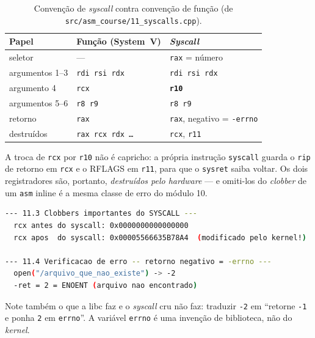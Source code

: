 \begin{table}[htbp]
\centering
\caption{Convenção de \emph{syscall} contra convenção de função
         (de \texttt{src/asm\_course/11\_syscalls.cpp}).}
\label{tab:syscall-abi}
\footnotesize
\begin{tabular}{@{}lll@{}}
\toprule
\textbf{Papel} & \textbf{Função (System~V)} & \textbf{\emph{Syscall}} \\
\midrule
seletor            & ---                  & \texttt{rax} = número \\
argumentos 1--3    & \texttt{rdi rsi rdx} & \texttt{rdi rsi rdx} \\
argumento 4        & \texttt{rcx}         & \textbf{\texttt{r10}} \\
argumentos 5--6    & \texttt{r8 r9}       & \texttt{r8 r9} \\
retorno            & \texttt{rax}         & \texttt{rax}, negativo = \texttt{-errno} \\
destruídos         & \texttt{rax rcx rdx \dots} & \texttt{rcx}, \texttt{r11} \\
\bottomrule
\end{tabular}
\end{table}

A troca de \texttt{rcx} por \texttt{r10} não é capricho: a própria instrução
\texttt{syscall} guarda o \texttt{rip} de retorno em \texttt{rcx} e o RFLAGS em
\texttt{r11}, para que o \texttt{sysret} saiba voltar. Os dois registradores
são, portanto, \emph{destruídos pelo hardware} --- e omiti-los do
\emph{clobber} de um \texttt{asm} inline é a mesma classe de erro do módulo 10.

\begin{lstlisting}[style=bt, language=bash,
    caption={Saída medida de \texttt{dist/bin/asm\_11\_syscalls}: a prova de que
             \texttt{rcx} é destruído, e o retorno negativo como \texttt{errno}.}]
--- 11.3 Clobbers importantes do SYSCALL ---
  rcx antes do syscall: 0x0000000000000000
  rcx apos  do syscall: 0x00005566635B78A4  (modificado pelo kernel!)

--- 11.4 Verificacao de erro -- retorno negativo = -errno ---
  open("/arquivo_que_nao_existe") -> -2
  -ret = 2 = ENOENT (arquivo nao encontrado)
\end{lstlisting}

Note também o que a libc faz e o \emph{syscall} cru não faz: traduzir
\texttt{-2} em ``retorne \texttt{-1} e ponha \texttt{2} em \texttt{errno}''. A
variável \texttt{errno} é uma invenção de biblioteca, não do \emph{kernel}.

